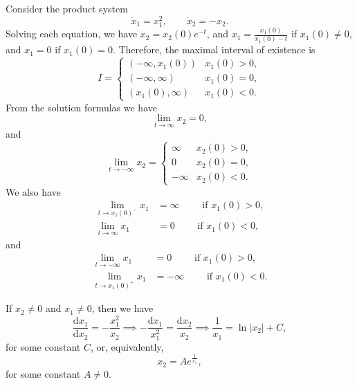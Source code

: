\documentclass[nonumber]{homework}
\begin{document}
	\maketitle
	
	
	Consider the product system
	\begin{equation*}
		\dot{x}_1 = x_1^2, \qquad \dot{x}_2 = -x_2.
	\end{equation*}
	Solving each equation, we have $x_2 = x_2(0)e^{-t}$, and $x_1 = \frac{x_1(0)}{x_1(0) - t}$ if $x_1(0)\ne0$, and $x_1 = 0$ if $x_1(0) = 0$. Therefore, the maximal interval of existence is 
	\begin{equation*}
		I = \begin{cases}
			(-\infty, x_1(0))& x_1(0) > 0,\\
			 (-\infty, \infty) & x_1(0) = 0, \\
			 (x_1(0), \infty) & x_1(0) < 0.
			\end{cases}
	\end{equation*}
	From the solution formulas we have
	\begin{equation*}
		\lim_{t\to \infty} x_2 = 0,
	\end{equation*}
	and
	\begin{equation*}
		\lim_{t\to-\infty}x_2 = \begin{cases}
			\infty & x_2(0) > 0, \\
			0 & x_2(0) = 0,\\
			-\infty & x_2(0) < 0.
		\end{cases}
	\end{equation*}
	We also have
	\begin{align*}
		\lim_{t\to x_1(0)^-} x_1 &= \infty \qquad \text{ if } x_1(0) > 0,\\
		\lim_{t\to\infty} x_1 &= 0 \qquad \text{ if } x_1(0) < 0,
	\end{align*}
	and
	\begin{align*}
		\lim_{t\to -\infty} x_1 &= 0 \qquad \text{ if } x_1(0) > 0,\\
		\lim_{t\to x_1(0)^+} x_1 &= -\infty \qquad \text{ if } x_1(0) < 0.
	\end{align*}
	
	If $x_2 \ne0$ and $x_1\ne0$, then we have
	\begin{equation*}
		\frac{\text{d}x_1}{\text{d}x_2} = -\frac{x_1^2}{x_2} \implies -\frac{\text{d}x_1}{x_1^2} = \frac{\text{d}x_2}{x_2} \implies \frac{1}{x_1} = \ln|x_2| + C,
	\end{equation*}
	for some constant $C$, or, equivalently,
	\begin{equation*}
		x_2 = Ae^\frac{1}{x_1},
	\end{equation*}
	for some constant $A \ne0$.
	
\end{document}
